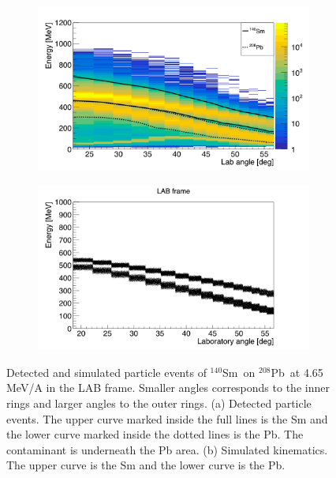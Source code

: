\documentclass[twoside,english]{uiofysmaster/uiofysmaster}
\newcommand{\Sm}{$^{140}$Sm} %
\newcommand{\Pb}{$^{208}$Pb}
\begin{document}
\begin{figure}[htb]
	\centering
	\begin{subfigure}[t]{0.49\textwidth}
		\centering
		\includegraphics[width=\textwidth]{../Plots/plotting/particle-events-wcut.png}
		\caption{}
		\label{fig:part_wcut}
	\end{subfigure}
	\hfill 
	\begin{subfigure}[t]{0.49\textwidth}
		\centering
    		\includegraphics[width=\textwidth]{../Plots/simulation/kin_140Sm_208Pb.png}
		\caption{}
		\label{fig:kinsim}
	\end{subfigure}
	\caption{Detected and simulated particle events of \Sm\ on \Pb\ at 4.65 MeV/A in the LAB frame. Smaller angles corresponds to the inner rings and larger angles to the outer rings.
	(a) Detected particle events. The upper curve marked inside the full lines is the Sm and the lower curve marked inside the dotted lines is the Pb. The contaminant is underneath the Pb area. 	
	(b) Simulated kinematics. The upper curve is the Sm and the lower curve is the Pb.
	}
	\label{fig:part_events}
\end{figure}
\end{document}
